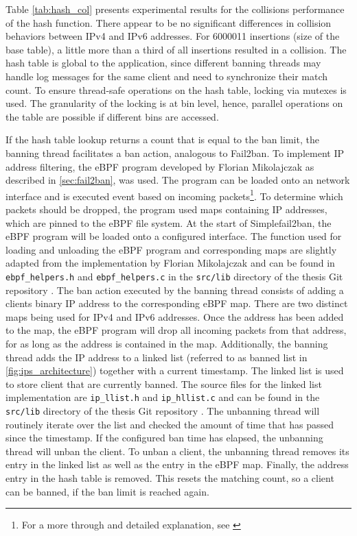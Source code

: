Table \ref{tab:hash_col} presents experimental results for the collisions performance of the hash function. 
There appear to be no significant differences in collision behaviors between \ac{IPv4} and \ac{IPv6} addresses.
For 6000011 insertions (size of the base table), a little more than a third of all insertions resulted in a collision. 
The hash table is global to the application, since different banning threads may handle log messages for the same
client and need to synchronize their match count. To ensure thread-safe operations on the hash table, locking via mutexes is used.
The granularity of the locking is at bin level, hence, parallel operations on the table are possible if different bins are accessed.
\par
If the hash table lookup returns a count that is equal to the ban limit, the banning thread facilitates a ban
action, analogous to Fail2ban. To implement \ac{IP} address filtering, the \ac{eBPF} program developed by Florian Mikolajczak \cite{mikolajczak2022}
 as described in \ref{sec:fail2ban}, was used. The program can be loaded onto an network interface and is executed event based on incoming packets\footnote{For a more through and detailed explanation, see \cite{mikolajczak2022}}.
To determine which packets should be dropped, the program used maps containing \ac{IP} addresses, which are pinned to the \ac{eBPF} file system.
At the start of Simplefail2ban, the \ac{eBPF} program will be loaded onto a configured interface. The function used for loading and unloading
the \ac{eBPF} program and corresponding maps are slightly adapted from the implementation by  Florian Mikolajczak and can be found in \texttt{ebpf\_helpers.h}
and \texttt{ebpf\_helpers.c} in the \texttt{src/lib} directory of the thesis Git repository \cite{gitlab}. The ban action executed by the banning thread
consists of adding a clients binary \ac{IP} address to the corresponding \ac{eBPF} map. There are two distinct maps being used for \ac{IPv4} and \ac{IPv6} addresses.
Once the address has been added to the map, the \ac{eBPF} program will drop all incoming packets from that address, for as long as the address is contained in the map.
Additionally, the banning thread adds the \ac{IP} address to a linked list (referred to as banned list in \ref{fig:ips_architecture}) together with a 
current timestamp. The linked list is used to store client that are currently banned. The source files for the linked list implementation are \texttt{ip\_llist.h}
and \texttt{ip\_hllist.c} and can be found in the \texttt{src/lib} directory of the thesis Git repository \cite{gitlab}. The unbanning thread will routinely iterate over the list 
and checked the amount of time that has passed since the timestamp. If the configured ban time has elapsed, the unbanning thread will unban the client.
To unban a client, the unbanning thread removes its entry in the linked list as well as the entry in the \ac{eBPF} map. Finally, the address entry in the
hash table is removed. This resets the matching count, so a client can be banned, if the ban limit is reached again.    

